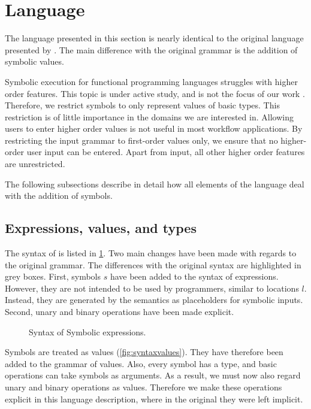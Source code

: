 

\section{Language}
\label{sec:language}

The language presented in this section is nearly identical to the original \TOPHAT language presented by \citet{DBLP:conf/ppdp/SteenvoordenNK19}.
The main difference with the original grammar is the addition of symbolic values.

Symbolic execution for functional programming languages struggles with higher order features.
This topic is under active study, and is not the focus of our work \cite{HallahanXP2017, DBLP:conf/pldi/HallahanXBJP19}.
Therefore, we restrict symbols to only represent values of basic types.
This restriction is of little importance in the domains we are interested in.
Allowing users to enter higher order values is not useful in most workflow applications.
By restricting the input grammar to first-order values only, we ensure that no higher-order user input can be entered.
Apart from input, all other higher order features are unrestricted.

The following subsections describe in detail how all elements of the \TOPHAT language deal with the addition of symbols.



\subsection{Expressions, values, and types}
\label{sec:expressions}

The syntax of \STOPHAT is listed in \cref{fig:syntaxtophat}.
Two main changes have been made with regards to the original \TOPHAT grammar.
The differences with the original syntax are highlighted in grey boxes.
First, symbols $s$ have been added to the syntax of expressions.
However, they are not intended to be used by programmers, similar to locations $l$.
Instead, they are generated by the semantics as placeholders for symbolic inputs.
Second, unary and binary operations have been made explicit.

\begin{figure}[ht]
  \small
  \caption{Syntax of Symbolic \TOPHAT expressions.}
  \label{fig:syntaxtophat}
\end{figure}

Symbols are treated as values (\cref{fig:syntaxvalues}).
They have therefore been added to the grammar of values.
Also, every symbol has a type, and basic operations can take symbols as arguments.
As a result, we must now also regard unary and binary operations as values.
Therefore we make these operations explicit in this language description,
where in the original they were left implicit.

